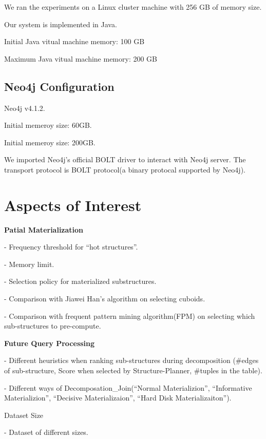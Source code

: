 We ran the experiments on a Linux cluster machine with 256 GB of memory size.  

Our system is implemented in Java. 

Initial Java vitual machine memory: 100 GB

Maximum Java vitual machine memory: 200 GB
\subsection{Neo4j Configuration}
Neo4j v4.1.2. 

Initial memeroy size: 60GB. 

Initial memeroy size: 200GB.

We imported Neo4j's official BOLT driver to interact with Neo4j server. The transport protocol is BOLT protocol(a binary protocal supported by Neo4j).

\section{Aspects of Interest}
\textbf{Patial Materialization}

-  Frequency threshold for “hot structures”.

-  Memory limit.

-  Selection policy for materialized substructures.
 
- Comparison with Jiawei Han’s algorithm on selecting cuboids.

- Comparison with frequent pattern mining algorithm(FPM) on selecting which sub-structures to pre-compute.

\textbf{Future Query Processing}

-  Different heuristics when ranking sub-structures during decomposition (#edges of sub-structure, Score when selected by Structure-Planner, #tuples in the table).

-  Different ways of Decomposation\_Join(“Normal Materializion”, “Informative Materializion”, “Decisive Materializaion”, “Hard Disk Materializaiton”).

Dataset Size

-  Dataset of different sizes.



